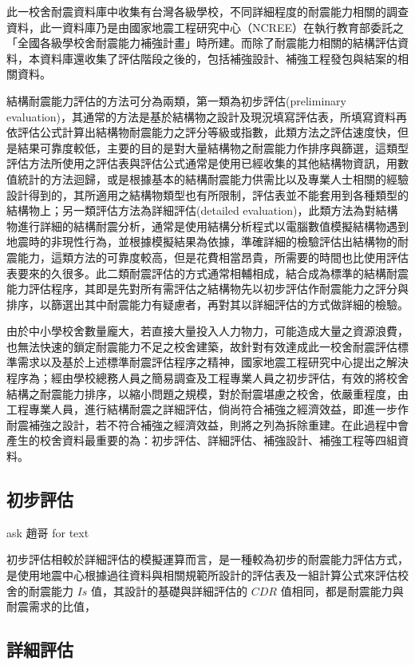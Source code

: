 此一校舍耐震資料庫中收集有台灣各級學校，不同詳細程度的耐震能力相關的調查資料，此一資料庫乃是由國家地震工程研究中心（NCREE）在執行教育部委託之「全國各級學校舍耐震能力補強計畫」時所建。而除了耐震能力相關的結構評估資料，本資料庫還收集了評估階段之後的，包括補強設計、補強工程發包與結案的相關資料。

結構耐震能力評估的方法可分為兩類，第一類為初步評估(preliminary evaluation)，其通常的方法是基於結構物之設計及現況填寫評估表，所填寫資料再依評估公式計算出結構物耐震能力之評分等級或指數，此類方法之評估速度快，但是結果可靠度較低，主要的目的是對大量結構物之耐震能力作排序與篩選，這類型評估方法所使用之評估表與評估公式通常是使用已經收集的其他結構物資訊，用數值統計的方法迴歸，或是根據基本的結構耐震能力供需比以及專業人士相關的經驗設計得到的，其所適用之結構物類型也有所限制，評估表並不能套用到各種類型的結構物上；另一類評估方法為詳細評估(detailed evaluation)，此類方法為對結構物進行詳細的結構耐震分析，通常是使用結構分析程式以電腦數值模擬結構物遇到地震時的非現性行為，並根據模擬結果為依據，準確詳細的檢驗評估出結構物的耐震能力，這類方法的可靠度較高，但是花費相當昂貴，所需要的時間也比使用評估表要來的久很多。此二類耐震評估的方式通常相輔相成，結合成為標準的結構耐震能力評估程序，其即是先對所有需評估之結構物先以初步評估作耐震能力之評分與排序，以篩選出其中耐震能力有疑慮者，再對其以詳細評估的方式做詳細的檢驗。

由於中小學校舍數量龐大，若直接大量投入人力物力，可能造成大量之資源浪費，也無法快速的鎖定耐震能力不足之校舍建築，故針對有效達成此一校舍耐震評估標準需求以及基於上述標準耐震評估程序之精神，國家地震工程研究中心提出之解決程序為；經由學校總務人員之簡易調查及工程專業人員之初步評估，有效的將校舍結構之耐震能力排序，以縮小問題之規模，對於耐震堪慮之校舍，依嚴重程度，由工程專業人員，進行結構耐震之詳細評估，倘尚符合補強之經濟效益，即進一步作耐震補強之設計，若不符合補強之經濟效益，則將之列為拆除重建。在此過程中會產生的校舍資料最重要的為：初步評估、詳細評估、補強設計、補強工程等四組資料。

\subsection{初步評估}

ask 趙哥 for text

初步評估相較於詳細評估的模擬運算而言，是一種較為初步的耐震能力評估方式，是使用地震中心根據過往資料與相關規範所設計的評估表及一組計算公式來評估校舍的耐震能力 $Is$ 值，其設計的基礎與詳細評估的 $CDR$ 值相同，都是耐震能力與耐震需求的比值，

\subsection{詳細評估}

